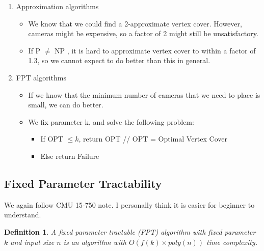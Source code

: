 \documentclass[12pt]{article}
\newtheorem{definition}{Definition}
\begin{document}
\begin{enumerate}
    \item Approximation algorithms
    \begin{itemize}
        \item We know that we could find a 2-approximate vertex cover. However, cameras might be
        expensive, so a factor of 2 might still be unsatisfactory.
        \item If P $\ne$ NP , it is hard to approximate vertex cover to within a factor of 1.3, so we cannot
        expect to do better than this in general.
    \end{itemize}
    \item FPT algorithms
    \begin{itemize}
        \item If we know that the minimum number of cameras that we need to place is small, we can do better.
        \item We fix parameter k, and solve the following problem:
            \begin{itemize}
                \item If OPT $\leq k$, return OPT // OPT = Optimal Vertex Cover
                \item Else return Failure
            \end{itemize}
    \end{itemize}
\end{enumerate}

\subsection{Fixed Parameter Tractability}

We again follow CMU 15-750 note. I personally think it is easier for beginner to understand.

\begin{definition}
    A fixed parameter tractable (FPT) algorithm with fixed parameter $k$ and input size $n$ is an algorithm with $O(f(k)\times poly(n))$ time complexity.
\end{definition}
\end{document}

